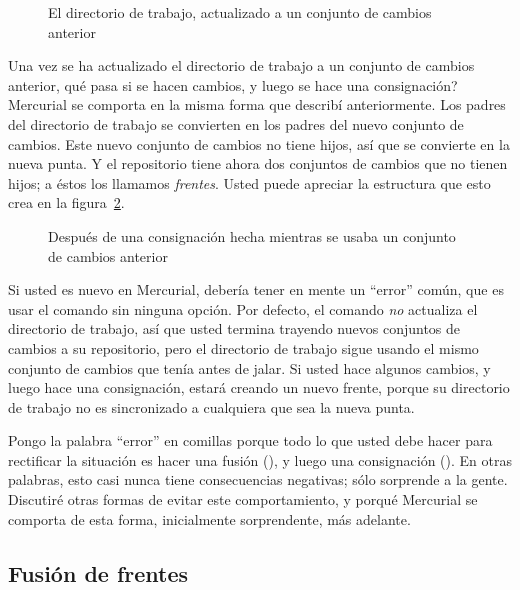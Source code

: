 \begin{figure}[ht]
  \centering
  \caption{El directorio de trabajo, actualizado a un conjunto de
  cambios anterior}
  \label{fig:concepts:wdir-pre-branch}
\end{figure}

Una vez se ha actualizado el directorio de trabajo a un conjunto de
cambios anterior, qué pasa si se hacen cambios, y luego se hace una
consignación? Mercurial se comporta en la misma forma que describí
anteriormente. Los padres del directorio de trabajo se convierten en
los padres del nuevo conjunto de cambios. Este nuevo conjunto de
cambios no tiene hijos, así que se convierte en la nueva punta. Y el
repositorio tiene ahora dos conjuntos de cambios que no tienen hijos;
a éstos los llamamos \emph{frentes}. Usted puede apreciar la
estructura que esto crea en la figura~\ref{fig:concepts:wdir-branch}.

\begin{figure}[ht]
  \centering
  \caption{Después de una consignación hecha mientras se usaba un
  conjunto de cambios anterior}
  \label{fig:concepts:wdir-branch}
\end{figure}

\begin{note}
    Si usted es nuevo en Mercurial, debería tener en mente un
    ``error'' común, que es usar el comando  sin ninguna
    opción. Por defecto, el comando  \emph{no} actualiza
    el directorio de trabajo, así que usted termina trayendo nuevos
    conjuntos de cambios a su repositorio, pero el directorio de
    trabajo sigue usando el mismo conjunto de cambios que tenía antes
    de jalar. Si usted hace algunos cambios, y luego hace una
    consignación, estará creando un nuevo frente, porque su directorio
    de trabajo no es sincronizado a cualquiera que sea la nueva punta.

    Pongo la palabra ``error'' en comillas porque todo lo que usted
    debe hacer para rectificar la situación es hacer una fusión
    (), y luego una consignación (). En
    otras palabras, esto casi nunca tiene consecuencias negativas;
    sólo sorprende a la gente. Discutiré otras formas de evitar este
    comportamiento, y porqué Mercurial se comporta de esta forma,
    inicialmente sorprendente, más adelante.
\end{note}

\subsection{Fusión de frentes}

